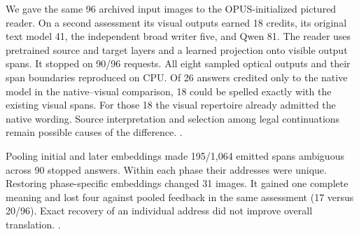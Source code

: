 We gave the same 96 archived input images to the OPUS-initialized pictured reader. On a second assessment its visual outputs earned 18 credits, its original text model 41, the independent broad writer five, and Qwen 81. The reader uses pretrained source and target layers and a learned projection onto visible output spans.\cite{opus} It stopped on 90/96 requests. All eight sampled optical outputs and their span boundaries reproduced on CPU. Of 26 answers credited only to the native model in the native--visual comparison, 18 could be spelled exactly with the existing visual spans. For those 18 the visual repertoire already admitted the native wording. Source interpretation and selection among legal continuations remain possible causes of the difference. .

Pooling initial and later embeddings made 195/1,064 emitted spans ambiguous across 90 stopped answers. Within each phase their addresses were unique. Restoring phase-specific embeddings changed 31 images. It gained one complete meaning and lost four against pooled feedback in the same assessment (17 versus 20/96). Exact recovery of an individual address did not improve overall translation. .
